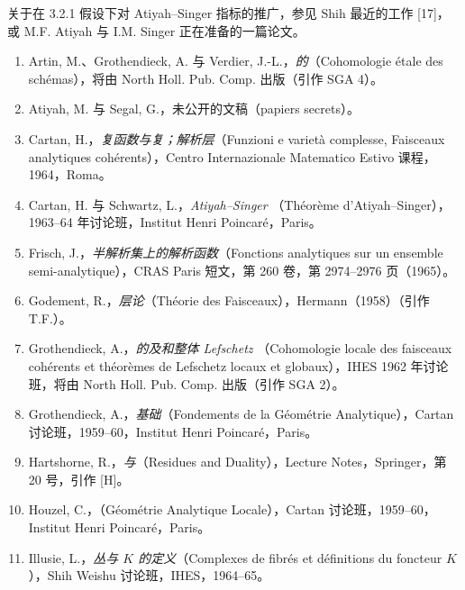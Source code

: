 关于在 3.2.1 假设下对 Atiyah--Singer 指标的推广，参见 Shih 最近的工作 [17]，或 M.F. Atiyah 与 I.M. Singer 正在准备的一篇论文。

\begin{enumerate}
\item[{[1]}] Artin, M.、Grothendieck, A. 与 Verdier, J.-L.，\emph{的}（Cohomologie étale des schémas），将由 North Holl. Pub. Comp. 出版（引作 SGA 4）。
\item[{[2]}] Atiyah, M. 与 Segal, G.，未公开的文稿（papiers secrets）。
\item[{[3]}] Cartan, H.，\emph{复函数与复；解析层}（Funzioni e varietà complesse, Faisceaux analytiques cohérents），Centro Internazionale Matematico Estivo 课程，1964，Roma。
\item[{[4]}] Cartan, H. 与 Schwartz, L.，\emph{Atiyah--Singer }（Théorème d'Atiyah--Singer），1963--64 年讨论班，Institut Henri Poincaré，Paris。
\item[{[5]}] Frisch, J.，\emph{半解析集上的解析函数}（Fonctions analytiques sur un ensemble semi-analytique），CRAS Paris 短文，第 260 卷，第 2974--2976 页（1965）。
\item[{[6]}] Godement, R.，\emph{层论}（Théorie des Faisceaux），Hermann（1958）（引作 T.F.）。
\item[{[7]}] Grothendieck, A.，\emph{的及和整体 Lefschetz }（Cohomologie locale des faisceaux cohérents et théorèmes de Lefschetz locaux et globaux），IHES 1962 年讨论班，将由 North Holl. Pub. Comp. 出版（引作 SGA 2）。
\item[{[8]}] Grothendieck, A.，\emph{基础}（Fondements de la Géométrie Analytique），Cartan 讨论班，1959--60，Institut Henri Poincaré，Paris。
\item[{[9]}] Hartshorne, R.，\emph{与}（Residues and Duality），Lecture Notes，Springer，第 20 号，引作 [H]。
\item[{[10]}] Houzel, C.，\emph{}（Géométrie Analytique Locale），Cartan 讨论班，1959--60，Institut Henri Poincaré，Paris。
\item[{[11]}] Illusie, L.，\emph{丛与 $K$ 的定义}（Complexes de fibrés et définitions du foncteur $K$），Shih Weishu 讨论班，IHES，1964--65。

\end{enumerate}

